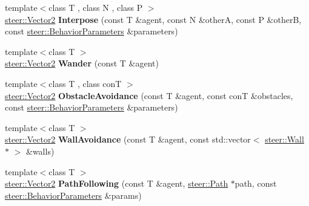 \begin{DoxyCompactItemize}
\item 
\hypertarget{namespacesteer_a27c6f945fad70eb64f596b6f2b7175ce}{{\footnotesize template$<$class T , class N , class P $>$ }\\\hyperlink{structsteer_1_1_vector2}{steer\-::\-Vector2} {\bfseries Interpose} (const T \&agent, const N \&other\-A, const P \&other\-B, const \hyperlink{structsteer_1_1_behavior_parameters}{steer\-::\-Behavior\-Parameters} \&parameters)}\label{namespacesteer_a27c6f945fad70eb64f596b6f2b7175ce}

\item 
\hypertarget{namespacesteer_acdf2f7fb4611cf711bdc56d13e2d3215}{{\footnotesize template$<$class T $>$ }\\\hyperlink{structsteer_1_1_vector2}{steer\-::\-Vector2} {\bfseries Wander} (const T \&agent)}\label{namespacesteer_acdf2f7fb4611cf711bdc56d13e2d3215}

\item 
\hypertarget{namespacesteer_add3f94518185f2080e8e3bdbe7a55ca9}{{\footnotesize template$<$class T , class con\-T $>$ }\\\hyperlink{structsteer_1_1_vector2}{steer\-::\-Vector2} {\bfseries Obstacle\-Avoidance} (const T \&agent, const con\-T \&obstacles, const \hyperlink{structsteer_1_1_behavior_parameters}{steer\-::\-Behavior\-Parameters} \&parameters)}\label{namespacesteer_add3f94518185f2080e8e3bdbe7a55ca9}

\item 
\hypertarget{namespacesteer_a6c6179f09888dc8685aa8b52c2afc377}{{\footnotesize template$<$class T $>$ }\\\hyperlink{structsteer_1_1_vector2}{steer\-::\-Vector2} {\bfseries Wall\-Avoidance} (const T \&agent, const std\-::vector$<$ \hyperlink{classsteer_1_1_wall}{steer\-::\-Wall} $\ast$ $>$ \&walls)}\label{namespacesteer_a6c6179f09888dc8685aa8b52c2afc377}

\item 
\hypertarget{namespacesteer_af64570a33da096432dba7a3d19dcf1b8}{{\footnotesize template$<$class T $>$ }\\\hyperlink{structsteer_1_1_vector2}{steer\-::\-Vector2} {\bfseries Path\-Following} (const T \&agent, \hyperlink{classsteer_1_1_path}{steer\-::\-Path} $\ast$path, const \hyperlink{structsteer_1_1_behavior_parameters}{steer\-::\-Behavior\-Parameters} \&params)}\label{namespacesteer_af64570a33da096432dba7a3d19dcf1b8}


\end{DoxyCompactItemize}
